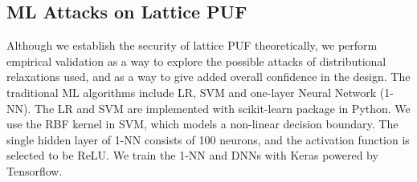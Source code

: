 
\subsection{ML Attacks on Lattice PUF}


Although we establish the security of lattice PUF theoretically, we perform empirical validation as a way to explore the possible attacks of distributional relaxations used, and as a way to give added overall confidence in the design. The traditional ML algorithms include LR, SVM and one-layer Neural Network (1-NN). The LR and SVM are implemented with scikit-learn package in Python. We use the RBF kernel in SVM, which models a non-linear decision boundary. The single hidden layer of 1-NN consists of 100 neurons, and the activation function is selected to be ReLU. We train the 1-NN and DNNs with Keras powered by Tensorflow.


